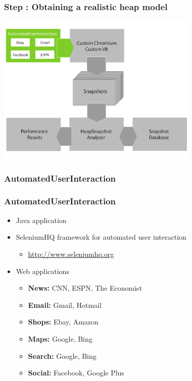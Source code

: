 \begin{frame}
	\frametitle{Step \theStepCounter: Obtaining a realistic heap model}		
	\includegraphics[width=26em]{../imgs/solution_h_1.pdf}
\end{frame}

\subsubsection{AutomatedUserInteraction}
\begin{frame}
	\frametitle{AutomatedUserInteraction}
	\begin{itemize}
		\item Java application
		\item SeleniumHQ framework for automated user interaction
		\begin{itemize}
			\item \href{http://www.seleniumhq.org/}{http://www.seleniumhq.org}
		\end{itemize}
		\item Web applications
		\begin{itemize}
			\item \textbf{News:} CNN, ESPN, The Economist
			\item \textbf{Email:} Gmail, Hotmail
			\item \textbf{Shops:} Ebay, Amazon
			\item \textbf{Maps:} Google, Bing
			\item \textbf{Search:} Google, Bing
			\item \textbf{Social:} Facebook, Google Plus
		\end{itemize}
	\end{itemize}
\end{frame}
	
